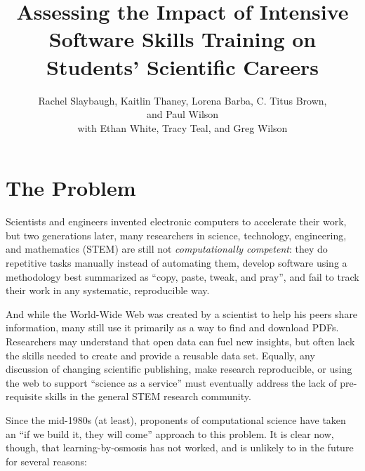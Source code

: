 \documentclass[11pt]{article}
\title{
  Assessing the Impact of Intensive Software Skills Training
  on Students' Scientific Careers
}
\author{
  Rachel Slaybaugh, Kaitlin Thaney, Lorena Barba, C. Titus Brown,\\   
  and Paul Wilson\\ 
  with Ethan White, Tracy Teal, and Greg Wilson
}
\begin{document}
\maketitle
\pagebreak
%
%

\section{The Problem}

Scientists and engineers invented electronic computers to accelerate
their work, but two generations later, many researchers in science,
technology, engineering, and mathematics (STEM) are still not
\emph{computationally competent}: they do repetitive tasks manually
instead of automating them, develop software using a methodology best
summarized as ``copy, paste, tweak, and pray'', and fail to track
their work in any systematic, reproducible way.

And while the World-Wide Web was created by a scientist to help his
peers share information, many still use it primarily as a way to find
and download PDFs.  Researchers may understand that open data can fuel
new insights, but often lack the skills needed to create and provide a
reusable data set.  Equally, any discussion of changing scientific
publishing, make research reproducible, or using the web to support
``science as a service'' must eventually address the lack of
pre-requisite skills in the general STEM research community.

Since the mid-1980s (at least), proponents of computational science
have taken an ``if we build it, they will come'' approach to this
problem.  It is clear now, though, that learning-by-osmosis has not
worked, and is unlikely to in the future for several reasons:
\end{document}

